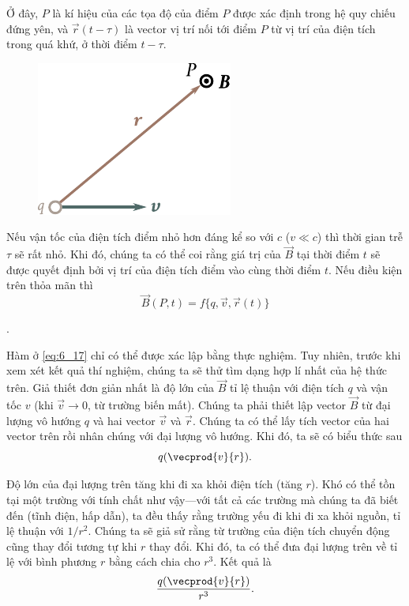 \noindent
Ở đây, $P$ là kí hiệu của các tọa độ của điểm $P$ được xác định trong hệ quy chiếu đứng yên, và $\vec{r}(t-\tau)$ là vector vị trí nối tới điểm $P$ từ vị trí của điện tích trong quá khứ, ở thời điểm $t-\tau$.

\begin{figure}[t]
	\begin{center}
		\includegraphics[scale=1]{figures/ch_06/fig_6_1.pdf}
		\caption[]{}
		\label{fig:6_1}
	\end{center}
	\vspace{-0.8cm}
\end{figure}

Nếu vận tốc của điện tích điểm nhỏ hơn đáng kể so với $c$ ($v\ll c$) thì thời gian trễ $\tau$ sẽ rất nhỏ. Khi đó, chúng ta có thể coi rằng giá trị của $\vec{B}$ tại thời điểm $t$ sẽ được quyết định bởi vị trí của điện tích điểm vào cùng thời điểm $t$. Nếu điều kiện trên thỏa mãn thì
\begin{equation}\label{eq:6_17}
    \vec{B}(P,t) = f\{q, \vec{v}, \vec{r}(t)\}
\end{equation}

\noindent
[ta thấy rằng vì $\vec{v}=\text{constant}$ nên $\vec{v}(t-\tau)=\vec{v}(t)$].

Hàm ở \eqref{eq:6_17} chỉ có thể được xác lập bằng thực nghiệm. Tuy nhiên, trước khi xem xét kết quả thí nghiệm, chúng ta sẽ thử tìm dạng hợp lí nhất của hệ thức trên. Giả thiết đơn giản nhất là độ lớn của $\vec{B}$ tỉ lệ thuận với điện tích $q$ và vận tốc $v$ (khi $\vec{v}\to 0$, từ trường biến mất). Chúng ta phải thiết lập vector $\vec{B}$ từ đại lượng vô hướng $q$ và hai vector $\vec{v}$ và $\vec{r}$. Chúng ta có thể lấy tích vector của hai vector trên rồi nhân chúng với đại lượng vô hướng. Khi đó, ta sẽ có biểu thức sau
\begin{equation}\label{eq:6_18}
    q (\vecprod{v}{r}).
\end{equation}

\noindent
Độ lớn của đại lượng trên tăng khi đi xa khỏi điện tích (tăng $r$). Khó có thể tồn tại một trường với tính chất như vậy---với tất cả các trường mà chúng ta đã biết đến (tĩnh điện, hấp dẫn), ta đều thấy rằng trường yếu đi khi đi xa khỏi nguồn, tỉ lệ thuận với $1/r^2$. Chúng ta sẽ giả sử rằng từ trường của điện tích chuyển động cũng thay đổi tương tự khi $r$ thay đổi. Khi đó, ta có thể đưa đại lượng trên về tỉ lệ với bình phương $r$ bằng cách chia  cho $r^3$. Kết quả là
\begin{equation}\label{eq:6_19}
    \frac{q (\vecprod{v}{r})}{r^3}.
\end{equation}

